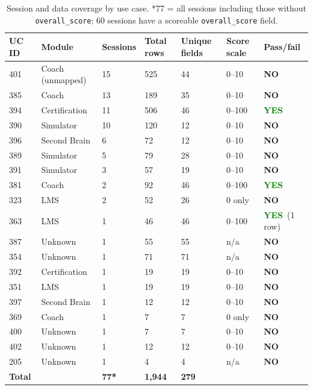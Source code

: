 \documentclass[12pt,a4paper]{article}
\newcommand{\yes}{\textcolor{green}{\textbf{YES}}}
\newcommand{\no}{\textcolor{rose}{\textbf{NO}}}
\begin{document}
\begin{landscape}
\begin{table}[H]
\centering\small
\begin{tabular}{C{2cm} L{4.5cm} R{2.2cm} R{2.5cm} R{2.5cm} C{3cm} C{3cm}}
\toprule
\textbf{UC ID} & \textbf{Module} & \textbf{Sessions} & \textbf{Total rows} &
\textbf{Unique fields} & \textbf{Score scale} & \textbf{Pass/fail} \\
\midrule
{}
401 & Coach (unmapped) & 15 & 525 & 44 & 0--10 & \no \\
385 & Coach            & 13 & 189 & 35 & 0--10 & \no \\
394 & Certification    & 11 & 506 & 46 & 0--100 & \yes \\
390 & Simulator        & 10 & 120 & 12 & 0--10  & \no \\
396 & Second Brain     &  6 &  72 & 12 & 0--10  & \no \\
389 & Simulator        &  5 &  79 & 28 & 0--10  & \no \\
391 & Simulator        &  3 &  57 & 19 & 0--10  & \no \\
381 & Coach            &  2 &  92 & 46 & 0--100 & \yes \\
323 & LMS              &  2 &  52 & 26 & 0 only & \no \\
363 & LMS              &  1 &  46 & 46 & 0--100 & \yes\ (1 row) \\
387 & Unknown          &  1 &  55 & 55 & n/a    & \no \\
354 & Unknown          &  1 &  71 & 71 & n/a    & \no \\
392 & Certification    &  1 &  19 & 19 & 0--10  & \no \\
351 & LMS              &  1 &  19 & 19 & 0--10  & \no \\
397 & Second Brain     &  1 &  12 & 12 & 0--10  & \no \\
369 & Coach            &  1 &   7 &  7 & 0 only & \no \\
400 & Unknown          &  1 &   7 &  7 & 0--10  & \no \\
402 & Unknown          &  1 &  12 & 12 & 0--10  & \no \\
205 & Unknown          &  1 &   4 &  4 & n/a    & \no \\
\midrule
\textbf{Total} & & \textbf{77*} & \textbf{1{,}944} & \textbf{279} & & \\
\bottomrule
\end{tabular}
\caption{Session and data coverage by use case.\quad
  *77 = all sessions including those without \texttt{overall\_score};
  60 sessions have a scoreable \texttt{overall\_score} field.}
\end{table}
\end{landscape}
\end{document}
